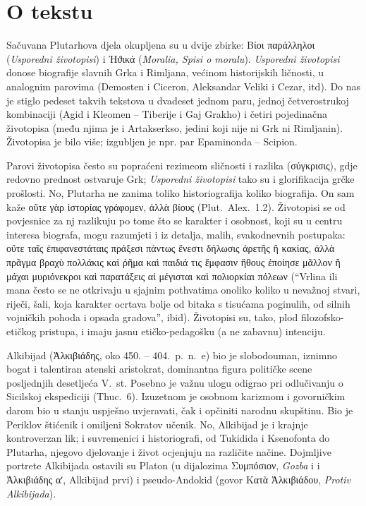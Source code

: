 


\section*{O tekstu}

Sačuvana Plutarhova djela okupljena su u dvije zbirke: Βίοι παράλληλοι (\textit{Usporedni životopisi}) i Ἠϑικά (\textit{Moralia, Spisi o moralu}). \textit{Usporedni životopisi} donose biografije slavnih Grka i Rimljana, većinom historijskih ličnosti, u analognim parovima (Demosten i Ciceron, Aleksandar Veliki i Cezar, itd). Do nas je stiglo pedeset takvih tekstova u dvadeset jednom paru, jednoj četverostrukoj kombinaciji (Agid i Kleomen – Tiberije i Gaj Grakho) i četiri pojedinačna životopisa (među njima je i Artakserkso, jedini koji nije ni Grk ni Rimljanin). Životopisa je bilo više; izgubljen je npr. par Epaminonda – Scipion.

Parovi životopisa često su popraćeni rezimeom sličnosti i razlika \textgreek[variant=ancient]{(σύγκρισις),} gdje redovno prednost ostvaruje Grk; \textit{Usporedni životopisi} tako su i glorifikacija grčke prošlosti. No, Plutarha ne zanima toliko historiografija koliko biografija. On sam kaže \textgreek[variant=ancient]{οὔτε γὰρ ἱστορίας γράφομεν, ἀλλὰ βίους} (Plut.\ Alex.~1.2). Životopisi se od povjesnice za nj razlikuju po tome što se karakter i osobnost, koji su u centru interesa biografa, mogu razumjeti i iz detalja, malih, svakodnevnih postupaka: \textgreek[variant=ancient]{οὔτε ταῖς ἐπιφανεστάταις πράξεσι πάντως ἔνεστι δήλωσις ἀρετῆς ἢ κακίας, ἀλλὰ πρᾶγμα βραχὺ πολλάκις καὶ ῥῆμα καὶ παιδιά τις ἔμφασιν ἤθους ἐποίησε μᾶλλον ἢ μάχαι μυριόνεκροι καὶ παρατάξεις αἱ μέγισται καὶ πολιορκίαι πόλεων} (``Vrlina ili mana često se ne otkrivaju u sjajnim pothvatima onoliko koliko u nevažnoj stvari, riječi, šali, koja karakter ocrtava bolje od bitaka s tisućama poginulih, od silnih vojničkih pohoda i opsada gradova'', ibid). Životopisi su, tako, plod filozofsko-etičkog pristupa, i imaju jasnu etičko-pedagošku (a ne zabavnu) intenciju. 

Alkibijad (Ἀλκιβιάδης, oko 450. – 404.\ p.~n.~e) bio je slobodouman, iznimno bogat i talentiran atenski aristokrat, dominantna figura političke scene posljednjih desetljeća V.\ st. Posebno je važnu ulogu odigrao pri odlučivanju o Sicilskoj ekspediciji (Thuc.~6). Izuzetnom je osobnom karizmom i govorničkim darom bio u stanju uspješno uvjeravati, čak i opčiniti narodnu skupštinu. Bio je Periklov štićenik i omiljeni Sokratov učenik. No, Alkibijad je i krajnje kontroverzan lik; i suvremenici i historiografi, od Tukidida i Ksenofonta do Plutarha, njegovo djelovanje i život ocjenjuju na različite načine. Dojmljive portrete Alkibijada ostavili su Platon (u dijalozima \textgreek[variant=ancient]{Συμπόσιον,} \textit{Gozba} i i \textgreek{Ἀλκιβιάδης αʹ,} Alkibijad prvi) i pseudo-Andokid (govor \textgreek[variant=ancient]{Κατὰ Ἀλκιβιάδου,} \textit{Protiv Alkibijada}).

